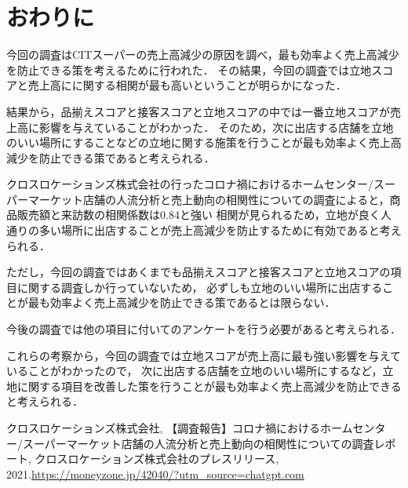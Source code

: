 \documentclass[uplatex]{jsarticle}
\begin{document}
\section{おわりに}


今回の調査はCITスーパーの売上高減少の原因を調べ，最も効率よく売上高減少を防止できる策を考えるために行われた．
その結果，今回の調査では立地スコアと売上高にに関する相関が最も高いということが明らかになった．

結果から，品揃えスコアと接客スコアと立地スコアの中では一番立地スコアが売上高に影響を与えていることがわかった．
そのため，次に出店する店舗を立地のいい場所にすることなどの立地に関する施策を行うことが最も効率よく売上高減少を防止できる策であると考えられる．

クロスロケーションズ株式会社の行ったコロナ禍におけるホームセンター/スーパーマーケット店舗の人流分析と売上動向の相関性についての調査によると，商品販売額と来訪数の相関係数は0.84と強い
相関が見られる\cite{crosslocations2021}ため，立地が良く人通りの多い場所に出店することが売上高減少を防止するために有効であると考えられる．

ただし，今回の調査ではあくまでも品揃えスコアと接客スコアと立地スコアの項目に関する調査しか行っていないため，
必ずしも立地のいい場所に出店することが最も効率よく売上高減少を防止できる策であるとは限らない．

今後の調査では他の項目に付いてのアンケートを行う必要があると考えられる．

これらの考察から，今回の調査では立地スコアが売上高に最も強い影響を与えていることがわかったので，
次に出店する店舗を立地のいい場所にするなど，立地に関する項目を改善した策を行うことが最も効率よく売上高減少を防止できると考えられる．


\begin{thebibliography}{9}
 クロスロケーションズ株式会社, 【調査報告】コロナ禍におけるホームセンター/スーパーマーケット店舗の人流分析と売上動向の相関性についての調査レポート, クロスロケーションズ株式会社のプレスリリース, 2021.\url{https://moneyzone.jp/42040/?utm_source=chatgpt.com}
\end{thebibliography}
\end{document}
